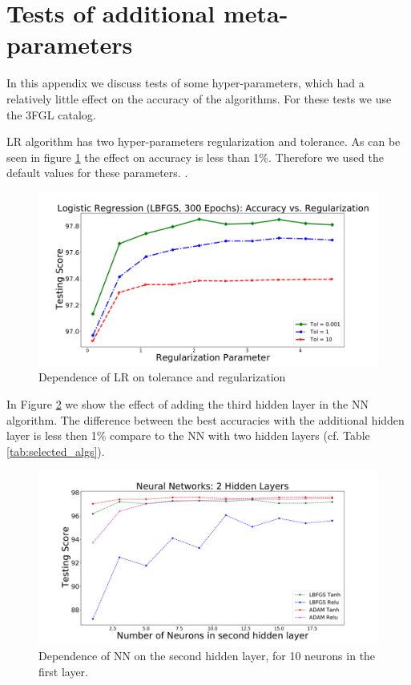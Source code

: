 \section{Tests of additional meta-parameters}

In this appendix we discuss tests of some hyper-parameters, which had a relatively little effect on the 
accuracy of the algorithms. For these tests we use the 3FGL catalog.

LR algorithm has two hyper-parameters regularization and tolerance. 
As can be seen in figure \ref{fig:LR_tol_reg} the effect on accuracy is less than 1\%. Therefore we used the default values for these parameters. . 
\begin{figure}[h]
\includegraphics[width=\twopicsp\textwidth]{plots/lr_train_reg.pdf}
\caption{Dependence of LR on tolerance and regularization}
\label{fig:LR_tol_reg}
\end{figure}

In Figure \ref{fig:nn_nn} we show the effect of adding the third hidden layer in the NN algorithm.
The difference between the best accuracies with the additional hidden layer is less then 1\%
compare to the NN with two hidden layers (cf. Table \ref{tab:selected_algs}).
\begin{figure}[h]
\includegraphics[width=\twopicsp\textwidth]{plots/nn_2layers_3fgl.pdf}
\caption{Dependence of NN on the second hidden layer, for 10 neurons in the first layer.
}
\label{fig:nn_nn}
\end{figure}

